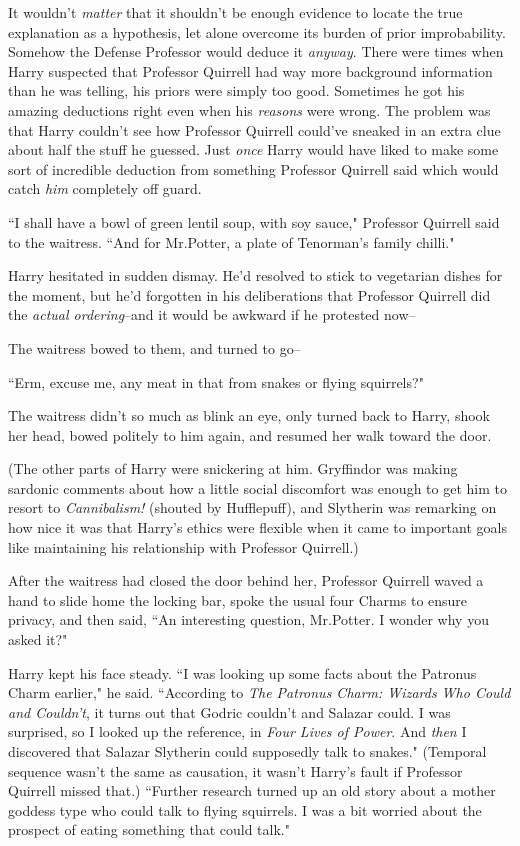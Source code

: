 It wouldn't \emph{matter} that it shouldn't be enough evidence to locate the true explanation as a hypothesis, let alone overcome its burden of prior improbability. Somehow the Defense Professor would deduce it \emph{anyway}. There were times when Harry suspected that Professor Quirrell had way more background information than he was telling, his priors were simply too good. Sometimes he got his amazing deductions right even when his \emph{reasons} were wrong. The problem was that Harry couldn't see how Professor Quirrell could've sneaked in an extra clue about half the stuff he guessed. Just \emph{once} Harry would have liked to make some sort of incredible deduction from something Professor Quirrell said which would catch \emph{him} completely off guard.

\later

``I shall have a bowl of green lentil soup, with soy sauce," Professor Quirrell said to the waitress. ``And for Mr.\?Potter, a plate of Tenorman's family chilli."

Harry hesitated in sudden dismay. He'd resolved to stick to vegetarian dishes for the moment, but he'd forgotten in his deliberations that Professor Quirrell did the \emph{actual ordering}\---and it would be awkward if he protested now\---

The waitress bowed to them, and turned to go\---

``Erm, excuse me, any meat in that from snakes or flying squirrels?"

The waitress didn't so much as blink an eye, only turned back to Harry, shook her head, bowed politely to him again, and resumed her walk toward the door.

(The other parts of Harry were snickering at him. Gryffindor was making sardonic comments about how a little social discomfort was enough to get him to resort to \emph{Cannibalism!} (shouted by Hufflepuff), and Slytherin was remarking on how nice it was that Harry's ethics were flexible when it came to important goals like maintaining his relationship with Professor Quirrell.)

After the waitress had closed the door behind her, Professor Quirrell waved a hand to slide home the locking bar, spoke the usual four Charms to ensure privacy, and then said, ``An interesting question, Mr.\?Potter. I wonder why you asked it?"

Harry kept his face steady. ``I was looking up some facts about the Patronus Charm earlier," he said. ``According to \emph{The Patronus Charm: Wizards Who Could and Couldn't}, it turns out that Godric couldn't and Salazar could. I was surprised, so I looked up the reference, in \emph{Four Lives of Power}. And \emph{then} I discovered that Salazar Slytherin could supposedly talk to snakes." (Temporal sequence wasn't the same as causation, it wasn't Harry's fault if Professor Quirrell missed that.) ``Further research turned up an old story about a mother goddess type who could talk to flying squirrels. I was a bit worried about the prospect of eating something that could talk."

